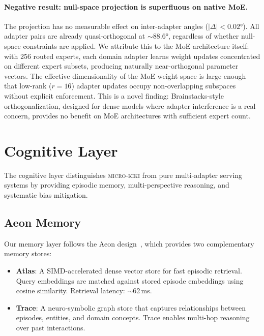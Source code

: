 \documentclass[11pt,a4paper]{article}
\begin{document}
\paragraph{Negative result: null-space projection is superfluous on native MoE.}
The projection has no measurable effect on inter-adapter angles ($|\Delta| < 0.02$°). All adapter pairs are already quasi-orthogonal at ${\sim}88.6$°, regardless of whether null-space constraints are applied. We attribute this to the MoE architecture itself: with 256 routed experts, each domain adapter learns weight updates concentrated on different expert subsets, producing naturally near-orthogonal parameter vectors. The effective dimensionality of the MoE weight space is large enough that low-rank ($r{=}16$) adapter updates occupy non-overlapping subspaces without explicit enforcement. This is a novel finding: Brainstacks-style orthogonalization, designed for dense models where adapter interference is a real concern, provides no benefit on MoE architectures with sufficient expert count.

\section{Cognitive Layer}
\label{sec:cognitive}

The cognitive layer distinguishes \textsc{micro-kiki} from pure multi-adapter serving systems by providing episodic memory, multi-perspective reasoning, and systematic bias mitigation.

\subsection{Aeon Memory}

Our memory layer follows the Aeon design~\citep{aeon2025}, which provides two complementary memory stores:

\begin{itemize}[nosep]
  \item \textbf{Atlas}: A SIMD-accelerated dense vector store for fast episodic retrieval. Query embeddings are matched against stored episode embeddings using cosine similarity. Retrieval latency: $\sim$62\,ms.
  \item \textbf{Trace}: A neuro-symbolic graph store that captures relationships between episodes, entities, and domain concepts. Trace enables multi-hop reasoning over past interactions.
\end{itemize}
\end{document}
